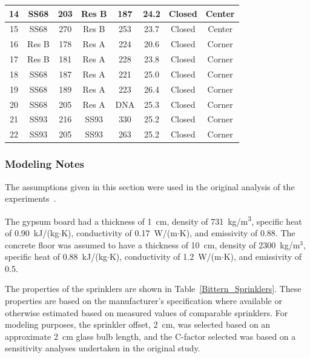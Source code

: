 \begin{table}[!ht]
\begin{tabular}{|c|c|c|c|c|c|c|c|}
14   & SS68   & 203      & Res B  & 187      & 24.2              & Closed & Center        \\ \hline
15   & SS68   & 270      & Res B  & 253      & 23.7              & Closed & Center        \\ \hline
16   & Res B  & 178      & Res A  & 224      & 20.6              & Closed & Corner        \\ \hline
17   & Res B  & 181      & Res A  & 228      & 23.8              & Closed & Corner        \\ \hline
18   & SS68   & 187      & Res A  & 221      & 25.0              & Closed & Corner        \\ \hline
19   & SS68   & 189      & Res A  & 223      & 26.4              & Closed & Corner        \\ \hline
20   & SS68   & 205      & Res A  & DNA      & 25.3              & Closed & Corner        \\ \hline
21   & SS93   & 216      & SS93   & 330      & 25.2              & Closed & Corner        \\ \hline
22   & SS93   & 205      & SS93   & 263      & 25.2              & Closed & Corner        \\ \hline
\end{tabular}
\end{table}

\subsubsection{Modeling Notes}

The assumptions given in this section were used in the original analysis of the experiments~\cite{Bittern:Thesis}.

The gypsum board had a thickness of 1~cm, density of 731~kg/m\textsuperscript{3}, specific heat of 0.90~kJ/(kg$\cdot$K), conductivity of 0.17~W/(m$\cdot$K), and emissivity of 0.88. The concrete floor was assumed to have a thickness of 10~cm, density of 2300~kg/m$^3$, specific heat of 0.88~kJ/(kg$\cdot$K), conductivity of 1.2~W/(m$\cdot$K), and emissivity of 0.5.

The properties of the sprinklers are shown in Table~\ref{Bittern_Sprinklers}. These properties are based on the manufacturer's specification where available or otherwise estimated based on measured values of comparable sprinklers. For modeling purposes, the sprinkler offset, 2~cm, was selected based on an approximate 2~cm glass bulb length, and the C-factor selected was based on a sensitivity analyses undertaken in the original study.

